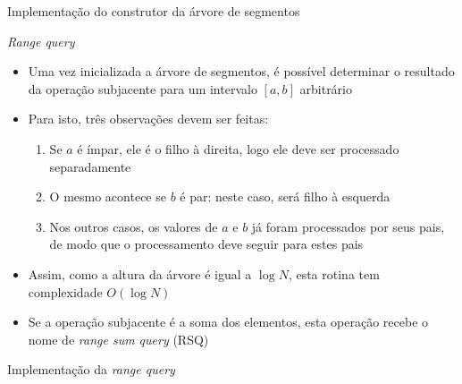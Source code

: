 

\begin{frame}[fragile]{Implementação do construtor da árvore de segmentos}
\end{frame}

\begin{frame}[fragile]{\it Range query}

    \begin{itemize}
        \item Uma vez inicializada a árvore de segmentos, é possível determinar o resultado
            da operação subjacente para um intervalo $[a, b]$ arbitrário

        \item Para isto, três observações devem ser feitas:
            \begin{enumerate}
                \item Se $a$ é ímpar, ele é o filho à direita, logo ele deve ser processado
                    separadamente

                \item O mesmo acontece se $b$ é par: neste caso, será filho à esquerda

                \item Nos outros casos, os valores de $a$ e $b$ já foram processados por seus
                    pais, de modo que o processamento deve seguir para estes pais
            \end{enumerate}

        \item Assim, como a altura da árvore é igual a $\log N$, esta rotina tem complexidade
            $O(\log N)$

        \item Se a operação subjacente é a soma dos elementos, esta operação recebe o nome de
            \textit{range sum query} (RSQ)
    \end{itemize}

\end{frame}



\begin{frame}[fragile]{Implementação da {\it range query}}
\end{frame}


